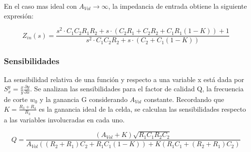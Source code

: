 En el caso mas ideal con $A_{Vol} \rightarrow \infty$, la impedancia de entrada obtiene la siguiente expresión:

\begin{equation}
Z_{in}(s)=\frac{s^{2}\cdot C_{1}C_{2}R_{1}R_{2} + s \cdot (C_{2}R_{1} + C_{2}R_{2} + C_{1}R_{1} (1-K)) + 1}{s^{2}\cdot C_{1}C_{2}R_{2} + s\cdot (C_{2} + C_{1}(1-K))}
    \label{eq:SK12}
\end{equation}

\subsubsection{Sensibilidades}

La sensibilidad relativa de una función y respecto a una variable x está dada por $S^{y}_{x} = \frac{x}{y}\frac{\partial y}{\partial x}$. Se analizan las sensibilidades para el factor de calidad Q, la frecuencia de corte $w_{0}$ y la ganancia G considerando $A_{Vol}$ constante. Recordando que $K = \frac{R_{3}+R_{4}}{R_{3}}$ es la ganancia ideal de la celda, se calculan las sensibilidades respecto a las variables involucradas en cada uno. 

$$Q = \frac{(A_{Vol}+K)\sqrt{R_{1}C_{1}R_{2}C_{2}}}{A_{Vol}((R_{2}+R_{1})C_{2}+R_{1}C_{1}(1-K))+K(R_{1}C_{1}+(R_{2}+R_{1})C_{2})} $$

